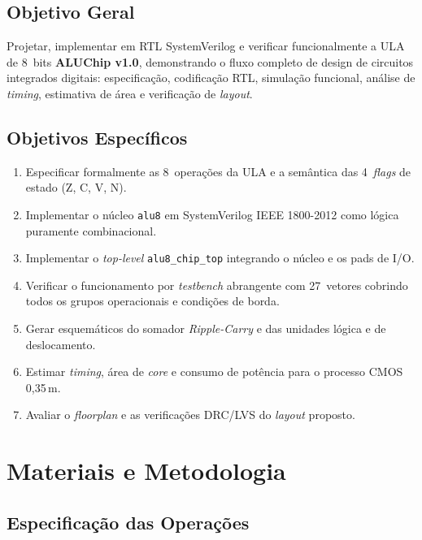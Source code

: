 \documentclass[12pt,a4paper]{article}
\begin{document}
\subsection{Objetivo Geral}

Projetar, implementar em RTL SystemVerilog e verificar funcionalmente a ULA de 8~bits \textbf{ALUChip v1.0}, demonstrando o fluxo completo de design de circuitos integrados digitais: especificação, codificação RTL, simulação funcional, análise de \textit{timing}, estimativa de área e verificação de \textit{layout}.

\subsection{Objetivos Específicos}

\begin{enumerate}[leftmargin=2em,label=\textbf{O\arabic*.}]
  \item Especificar formalmente as 8~operações da ULA e a semântica das 4~\textit{flags} de estado (Z, C, V, N).
  \item Implementar o núcleo \texttt{alu8} em SystemVerilog IEEE 1800-2012 como lógica puramente combinacional.
  \item Implementar o \textit{top-level} \texttt{alu8\_chip\_top} integrando o núcleo e os pads de I/O.
  \item Verificar o funcionamento por \textit{testbench} abrangente com 27~vetores cobrindo todos os grupos operacionais e condições de borda.
  \item Gerar esquemáticos do somador \textit{Ripple-Carry} e das unidades lógica e de deslocamento.
  \item Estimar \textit{timing}, área de \textit{core} e consumo de potência para o processo CMOS 0,35\,\textmu m.
  \item Avaliar o \textit{floorplan} e as verificações DRC/LVS do \textit{layout} proposto.
\end{enumerate}

\section{Materiais e Metodologia}

\subsection{Especificação das Operações}
\end{document}
